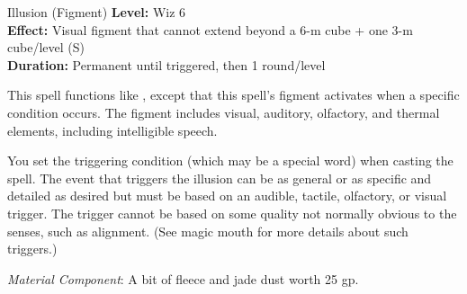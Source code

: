 {Illusion (Figment)}
{
	\textbf{Level:}
	Wiz 6\\
	\textbf{Effect:}
	Visual figment that cannot extend beyond a 6-m cube + one 3-m cube/level (S)\\
	\textbf{Duration:}
	Permanent until triggered, then 1 round/level\\
}
{
	This spell functions like , except that this spell's figment activates when a specific condition occurs. The figment includes visual, auditory, olfactory, and thermal elements, including intelligible speech.

	You set the triggering condition (which may be a special word) when casting the spell. The event that triggers the illusion can be as general or as specific and detailed as desired but must be based on an audible, tactile, olfactory, or visual trigger. The trigger cannot be based on some quality not normally obvious to the senses, such as alignment. (See magic mouth for more details about such triggers.)

	\textit{Material Component}:
	A bit of fleece and jade dust worth 25 gp.

}
